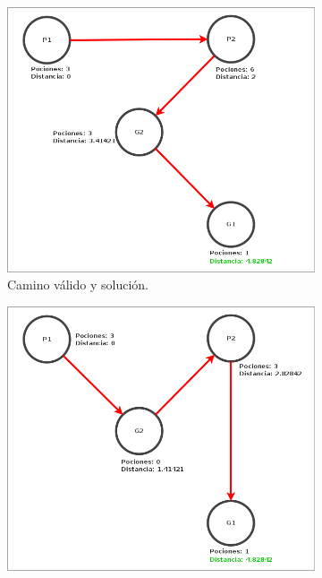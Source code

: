 \begin{figure}[H]
    \begin{subfigure}[b]{0.49\textwidth}
        \includegraphics[width=\linewidth]{img/ejercicio1/ejercicio1_ejemplo_camino1_1.png}
        \caption{Camino válido y solución.}
        \label{fig: ejercicio1_ejemplo_camino1_1}
    \end{subfigure}
    \begin{subfigure}[b]{0.49\textwidth}
        \includegraphics[width=\linewidth]{img/ejercicio1/ejercicio1_ejemplo_camino1_2.png}

\end{subfigure}
\end{figure}
